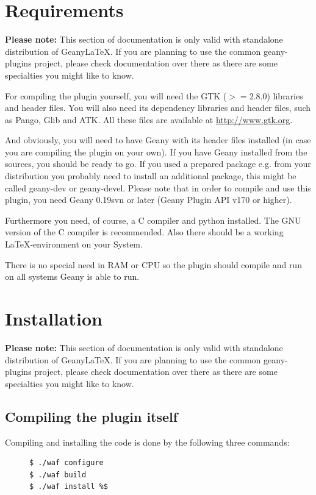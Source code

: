 \documentclass[%
paper=a4,%
fontsize=11pt,%
twoside=false,%
DIV18,
headsepline,
plainheadsepline,
footsepline,
plainfootsepline,
bibliography=totoc,%
listof=totoc,%
BCOR10mm,%
parskip=half,%
openany,%
]{scrartcl}
\begin{document}
\newpage
\section{Requirements}

\small{\textbf{Please note:} This section of documentation is only
valid with standalone distribution of Geany\LaTeX{}. If you are
planning to use the common geany-plugins project, please check
documentation over there as there are some specialties you might
like to know.}

For compiling the plugin yourself, you will need the GTK ($>= 2.8.0$)
libraries and header files. You will also need its dependency
libraries and header files, such as Pango, Glib and ATK. All these
files are available at \url{http://www.gtk.org}.

And obviously, you will need to have Geany with its header files
installed (in case you are compiling the plugin on your own). If you
have Geany installed from the sources, you should be ready to go. If
you used a prepared package e.g. from your distribution you probably
need to install an additional package, this might be called geany-dev
or geany-devel. Please note that in order to compile and use this
plugin, you need Geany 0.19svn or later (Geany Plugin API v170 or higher).

Furthermore you need, of course, a C compiler and python installed. The
GNU version of the C compiler is recommended. Also there should be a
working \LaTeX-environment on your System.

There is no special need in RAM or CPU so the plugin should compile and
run on all systems Geany is able to run.

\section{Installation}

\small{\textbf{Please note:} This section of documentation is only
valid with standalone distribution of Geany\LaTeX{}. If you are
planning to use the common geany-plugins project, please check
documentation over there as there are some specialties you might
like to know.}

\subsection{Compiling the plugin itself}
Compiling and installing the code is done by the following three
commands:

\begin{figure}[h!]
\begin{lstlisting}
$ ./waf configure
$ ./waf build
$ ./waf install %$
\end{lstlisting}
\end{figure}
\end{document}
